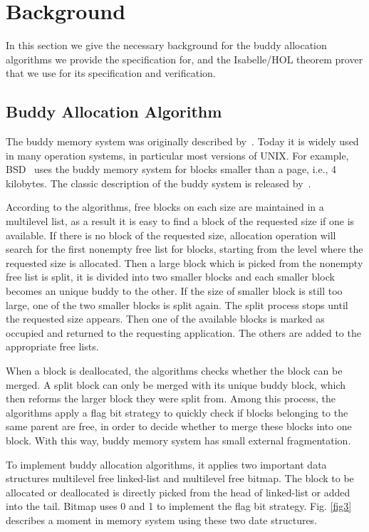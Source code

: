 \section{Background}
In this section we give the necessary background for the buddy allocation algorithms we provide the specification for, and the Isabelle/HOL theorem prover that we use for its specification and verification.

\subsection{Buddy Allocation Algorithm}
The buddy memory system was originally described by~\cite{reg_knowlton}. Today it is widely used in many operation systems, in particular most versions of UNIX. For example, BSD~\cite{reg_mckusick} uses the buddy memory system for blocks smaller than a page, i.e., 4 kilobytes. The classic description of the buddy system is released by~\cite{reg_knuth}.

According to the algorithms, free blocks on each size are maintained in a multilevel list, as a result it is easy to find a block of the requested size if one is available. If there is no block of the requested size, allocation operation will search for the first nonempty free list for blocks, starting from the level where the requested size is allocated. Then a large block which is picked from the nonempty free list is split, it is divided into two smaller blocks and each smaller block becomes an unique buddy to the other. If the size of smaller block is still too large, one of the two smaller blocks is split again. The split process stops until the requested size appears. Then one of the available blocks is marked as occupied and returned to the requesting application. The others are added to the appropriate free lists.

When a block is deallocated, the algorithms checks whether the block can be merged. A split block can only be merged with its unique buddy block, which then reforms the larger block they were split from. Among this process, the algorithms apply a flag bit strategy to quickly check if blocks belonging to the same parent are free, in order to decide whether to merge these blocks into one block. With this way, buddy memory system has small external fragmentation.

To implement buddy allocation algorithms, it applies two important data structures multilevel free linked-list and multilevel free bitmap. The block to be allocated or deallocated is directly picked from the head of linked-list or added into the tail. Bitmap uses 0 and 1 to implement the flag bit strategy. Fig. \ref{fig3} describes a moment in memory system using these two date structures.

